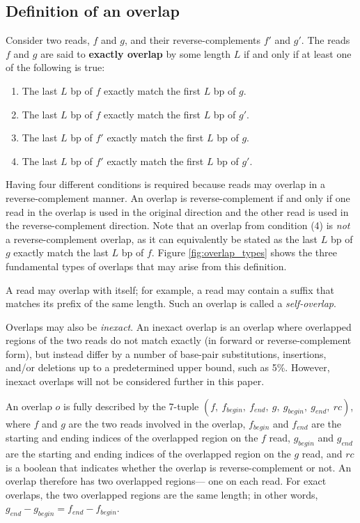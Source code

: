 \documentclass[10pt]{article}
\newcommand{\LengthVar}{L}
\newcommand{\Figure}[1]{Figure \ref{#1}}
\newcommand{\KeyTerm}[1]{{\it #1}}
\begin{document}
\subsection{Definition of an overlap}
	Consider two reads, $f$ and $g$, and their reverse-complements $f'$ and
	$g'$.  The reads $f$ and $g$ are said to {\bf exactly overlap} by some
	length $\LengthVar$ if and only if at least one of the following is
	true:
	\begin{enumerate}
		\item The last $\LengthVar$ bp of $f$ exactly match the first
		$\LengthVar$ bp of $g$.
		\item The last $\LengthVar$ bp of $f$ exactly match the first
		$\LengthVar$ bp of $g'$.
		\item The last $\LengthVar$ bp of $f'$ exactly match the first
		$\LengthVar$ bp of $g$.
		\item The last $\LengthVar$ bp of $f'$ exactly match the first
		$\LengthVar$ bp of $g'$.
	\end{enumerate}

Having four different conditions is required because reads may overlap in a
reverse-complement manner.  An overlap is reverse-complement if and only if one
read in the overlap is used in the original direction and the other read is used
in the reverse-complement direction.  Note that an overlap from condition (4) is
{\em not} a reverse-complement overlap, as it can equivalently be stated as the
last $\LengthVar$ bp of $g$ exactly match the last $\LengthVar$ bp of $f$.
\Figure{fig:overlap_types} shows the three fundamental types of overlaps that
may arise from this definition.

A read may overlap with itself; for example, a read may contain a suffix that
matches its prefix of the same length.  Such an overlap is called a
\KeyTerm{self-overlap}.

Overlaps may also be \KeyTerm{inexact}.  An inexact overlap is an overlap where
overlapped regions of the two reads do not match exactly (in forward or
reverse-complement form), but instead differ by a number of base-pair
substitutions, insertions, and/or deletions up to a predetermined upper bound,
such as 5\%.  However, inexact overlaps will not be considered further in this
paper.

An overlap $o$ is fully described by the 7-tuple $(f,\ f_{begin},\ f_{end},\ g,
\ g_{begin},\ g_{end},\ rc)$, where $f$ and $g$ are the two reads involved in the
overlap, $f_{begin}$ and $f_{end}$ are the starting and ending indices of the
overlapped region on the $f$ read, $g_{begin}$ and $g_{end}$ are the starting
and ending indices of the overlapped region on the $g$ read, and $rc$ is a
boolean that indicates whether the overlap is reverse-complement or not.  An
overlap therefore has two overlapped regions--- one on each read.  For exact
overlaps, the two overlapped regions are the same length; in other words,
$g_{end} - g_{begin} = f_{end} - f_{begin}$.
\end{document}
